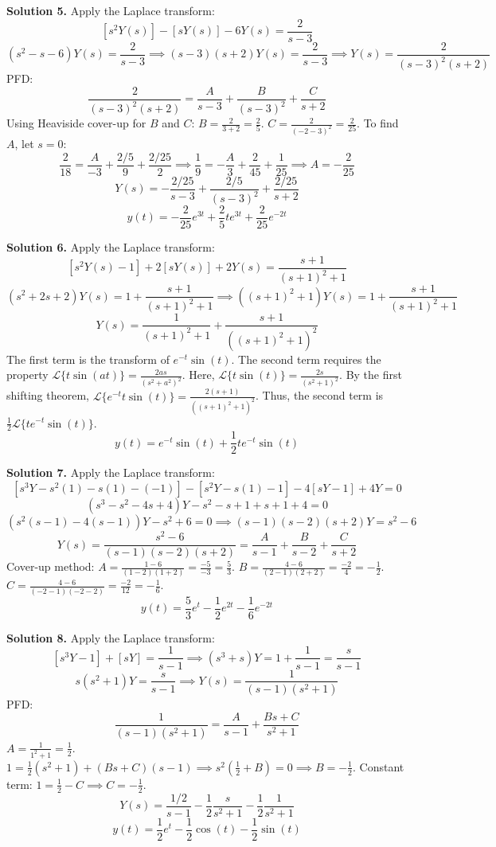 \documentclass[11pt, letterpaper]{article}
\theoremstyle{definition}
\theoremstyle{remark}
\begin{document}
\vspace{1em}
\textbf{Solution 5.}
Apply the Laplace transform:
\[ [s^2 Y(s)] - [sY(s)] - 6Y(s) = \frac{2}{s - 3} \]
\[ (s^2 - s - 6)Y(s) = \frac{2}{s - 3} \implies (s - 3)(s + 2)Y(s) = \frac{2}{s - 3} \implies Y(s) = \frac{2}{(s - 3)^2(s + 2)} \]
PFD:
\[ \frac{2}{(s - 3)^2(s + 2)} = \frac{A}{s - 3} + \frac{B}{(s - 3)^2} + \frac{C}{s + 2} \]
Using Heaviside cover-up for $B$ and $C$:
$B = \frac{2}{3 + 2} = \frac{2}{5}$. $C = \frac{2}{(-2 - 3)^2} = \frac{2}{25}$.
To find $A$, let $s = 0$:
\[ \frac{2}{18} = \frac{A}{-3} + \frac{2/5}{9} + \frac{2/25}{2} \implies \frac{1}{9} = -\frac{A}{3} + \frac{2}{45} + \frac{1}{25} \implies A = -\frac{2}{25} \]
\[ Y(s) = -\frac{2/25}{s - 3} + \frac{2/5}{(s - 3)^2} + \frac{2/25}{s + 2} \]
\[ y(t) = -\frac{2}{25}e^{3t} + \frac{2}{5}te^{3t} + \frac{2}{25}e^{-2t} \]

\vspace{1em}
\textbf{Solution 6.}
Apply the Laplace transform:
\[ [s^2 Y(s) - 1] + 2[sY(s)] + 2Y(s) = \frac{s + 1}{(s + 1)^2 + 1} \]
\[ (s^2 + 2s + 2)Y(s) = 1 + \frac{s + 1}{(s + 1)^2 + 1} \implies ((s + 1)^2 + 1)Y(s) = 1 + \frac{s + 1}{(s + 1)^2 + 1} \]
\[ Y(s) = \frac{1}{(s + 1)^2 + 1} + \frac{s + 1}{((s + 1)^2 + 1)^2} \]
The first term is the transform of $e^{-t}\sin(t)$. The second term requires the property $\mathcal{L}\{t\sin(at)\} = \frac{2as}{(s^2+a^2)^2}$.
Here, $\mathcal{L}\{t\sin(t)\} = \frac{2s}{(s^2+1)^2}$. By the first shifting theorem, $\mathcal{L}\{e^{-t}t\sin(t)\} = \frac{2(s+1)}{((s+1)^2+1)^2}$.
Thus, the second term is $\frac{1}{2} \mathcal{L}\{t e^{-t}\sin(t)\}$.
\[ y(t) = e^{-t}\sin(t) + \frac{1}{2}t e^{-t}\sin(t) \]

\vspace{1em}
\textbf{Solution 7.}
Apply the Laplace transform:
\[ [s^3 Y - s^2(1) - s(1) - (-1)] - [s^2 Y - s(1) - 1] - 4[sY - 1] + 4Y = 0 \]
\[ (s^3 - s^2 - 4s + 4)Y - s^2 - s + 1 + s + 1 + 4 = 0 \]
\[ (s^2(s - 1) - 4(s - 1))Y - s^2 + 6 = 0 \implies (s - 1)(s - 2)(s + 2)Y = s^2 - 6 \]
\[ Y(s) = \frac{s^2 - 6}{(s - 1)(s - 2)(s + 2)} = \frac{A}{s - 1} + \frac{B}{s - 2} + \frac{C}{s + 2} \]
Cover-up method:
$A = \frac{1 - 6}{(1 - 2)(1 + 2)} = \frac{-5}{-3} = \frac{5}{3}$.
$B = \frac{4 - 6}{(2 - 1)(2 + 2)} = \frac{-2}{4} = -\frac{1}{2}$.
$C = \frac{4 - 6}{(-2 - 1)(-2 - 2)} = \frac{-2}{12} = -\frac{1}{6}$.
\[ y(t) = \frac{5}{3}e^t - \frac{1}{2}e^{2t} - \frac{1}{6}e^{-2t} \]

\vspace{1em}
\textbf{Solution 8.}
Apply the Laplace transform:
\[ [s^3 Y - 1] + [sY] = \frac{1}{s - 1} \implies (s^3 + s)Y = 1 + \frac{1}{s - 1} = \frac{s}{s - 1} \]
\[ s(s^2 + 1)Y = \frac{s}{s - 1} \implies Y(s) = \frac{1}{(s - 1)(s^2 + 1)} \]
PFD:
\[ \frac{1}{(s - 1)(s^2 + 1)} = \frac{A}{s - 1} + \frac{Bs + C}{s^2 + 1} \]
$A = \frac{1}{1^2 + 1} = \frac{1}{2}$.
$1 = \frac{1}{2}(s^2 + 1) + (Bs + C)(s - 1) \implies s^2\left(\frac{1}{2} + B\right) = 0 \implies B = -\frac{1}{2}$.
Constant term: $1 = \frac{1}{2} - C \implies C = -\frac{1}{2}$.
\[ Y(s) = \frac{1/2}{s - 1} - \frac{1}{2}\frac{s}{s^2 + 1} - \frac{1}{2}\frac{1}{s^2 + 1} \]
\[ y(t) = \frac{1}{2}e^t - \frac{1}{2}\cos(t) - \frac{1}{2}\sin(t) \]
\end{document}
